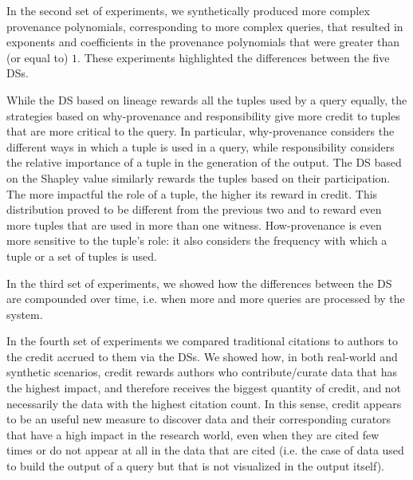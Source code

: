\documentclass[preprint,12pt,sort&compress]{elsarticle}
\newcommand{\rtwo}[1]{\textcolor{reviewer2}{#1}}
\newcommand{\eat}[1]{}
\newcommand{\scream}[1]{{\bf * #1 *}{\typeout{#1}}}
\begin{document}
In the second set of experiments, we synthetically produced more complex provenance polynomials, corresponding to more complex queries, that resulted in exponents and coefficients in the provenance polynomials that were greater than (or equal to) $1$.
These experiments highlighted the differences between the five DSs.
\eat{
In this way, we showed that, even though all three DS can highlight all the tuples used by the queries in the database, the three have different behaviors. }
\rtwo{While the DS based on lineage rewards all the tuples used by a query equally, the strategies based on why-provenance and responsibility give more credit to  tuples that are more critical to the query.
In particular, why-provenance considers the different ways in which a tuple is used in a query, while responsibility considers the relative importance of a tuple in the generation of the output.}  
\rtwo{The DS based on the Shapley value similarly rewards the tuples based on their participation. The more impactful the role of a tuple, the higher its reward in credit. This distribution proved to be different from the previous two and to reward even more tuples that are used in more than one witness.}
How-provenance is even more sensitive to the tuple's role: it also considers the frequency with which a tuple or a set of tuples is used. %

In the third set of experiments, we showed how the differences between the DS are compounded over time, i.e. when more and more queries are processed by the system.

In the fourth set of experiments we compared traditional citations to authors to the credit accrued to them via the DSs. We showed how, in both real-world and synthetic scenarios, credit rewards authors 
who contribute/curate data that has the highest impact, and therefore receives the biggest quantity of credit, and not necessarily the data with the highest citation count. 
In this sense, credit appears to be an useful new measure to discover data and their corresponding curators that have a high impact in the research world, even when they are cited few times or do not appear at all in the data that are cited (i.e. the case of data used to build the output of a query but that is not visualized in the output itself).

 
\eat{
In more complex and sophisticated scenarios, where different strategies may be implemented to decide the generated quantity of credit to be distributed, new factors beyond the only ``quantity'' of curated data can be factored in in rewarding data curators.
The result will be a distribution of credit that represents even better the actual work and worth of data curators and their impact in the scientific community.}
\eat{
\screams{I reworded to this.}
Other, more sophisticated, strategies could also be used to decide how credit is distributed between the authors, beyond the uniform distribution used here.}
\end{document}

